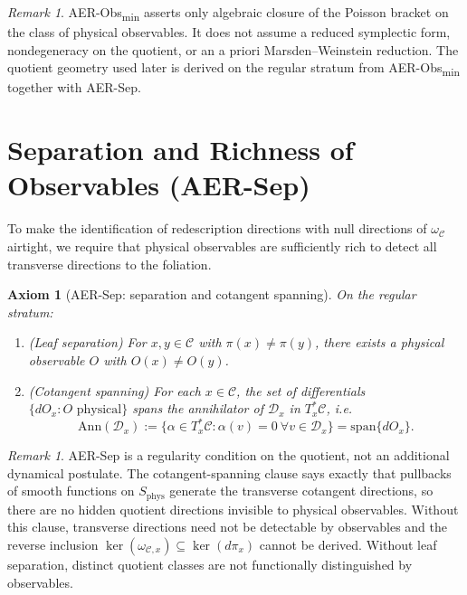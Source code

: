 \documentclass[11pt]{article}
\newtheorem{axiom}[definition]{Axiom}
\theoremstyle{remark}
\newtheorem{remark}[definition]{Remark}
\theoremstyle{plain}
\begin{document}
\begin{remark}
AER-Obs\textsubscript{min} asserts only algebraic closure of the Poisson bracket on the class of physical observables.
It does not assume a reduced symplectic form, nondegeneracy on the quotient, or an a priori Marsden--Weinstein reduction.
The quotient geometry used later is derived on the regular stratum from AER-Obs\textsubscript{min} together with AER-Sep.
\end{remark}

\section{Separation and Richness of Observables (AER-Sep)}

To make the identification of redescription directions with null directions of $\omega_{\mathcal{C}}$ airtight,
we require that physical observables are sufficiently rich to detect all transverse directions to the foliation.

\begin{axiom}[AER-Sep: separation and cotangent spanning]
\label{ax:sep}
On the regular stratum:
\begin{enumerate}
\item (\emph{Leaf separation}) For $x,y\in\mathcal{C}$ with $\pi(x)\neq \pi(y)$, there exists a physical observable $O$ with $O(x)\neq O(y)$.
\item (\emph{Cotangent spanning}) For each $x\in\mathcal{C}$, the set of differentials $\{dO_x: O \text{ physical}\}$ spans the annihilator of $\mathcal{D}_x$ in $T_x^*\mathcal{C}$, i.e.
\begin{equation}
\mathrm{Ann}(\mathcal{D}_x):=\{\alpha\in T_x^*\mathcal{C}:\alpha(v)=0\ \forall v\in\mathcal{D}_x\}
= \mathrm{span}\{dO_x\}.
\end{equation}
\end{enumerate}
\end{axiom}

\begin{remark}
AER-Sep is a regularity condition on the quotient, not an additional dynamical postulate.
The cotangent-spanning clause says exactly that pullbacks of smooth functions on $S_{\mathrm{phys}}$ generate the transverse cotangent directions,
so there are no hidden quotient directions invisible to physical observables.
Without this clause, transverse directions need not be detectable by observables and the reverse inclusion
$\ker(\omega_{\mathcal{C},x})\subseteq\ker(d\pi_x)$ cannot be derived.
Without leaf separation, distinct quotient classes are not functionally distinguished by observables.
\end{remark}
\end{document}
